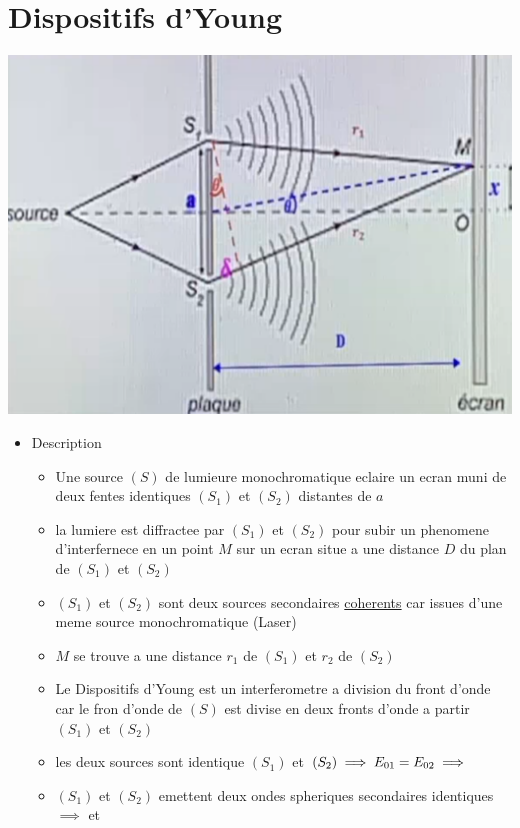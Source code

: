 \documentclass[12pt]{book}
\begin{document}
        \section{Dispositifs d'Young}
            \begin{center}
                \includegraphics[width=0.3\linewidth]{pic/young.png}
            \end{center}
            \begin{itemize}
               \item Description \\
                    \begin{itemize}
                        \item Une source $(S)$ de lumieure monochromatique eclaire un ecran muni de deux fentes identiques $(S_1)$ et $(S_2)$ distantes de $a$
                        \item la lumiere est diffractee par $(S_1)$ et $(S_2)$ pour subir un phenomene d'interfernece en un point $M$ sur un ecran situe a une distance $D$ du plan de $(S_1)$ et $(S_2)$ 
                        \item $(S_1)$ et $(S_2)$ sont deux sources secondaires \underline{coherents} car issues d'une meme source monochromatique (Laser)
                        \item $M$ se trouve a une distance $r_1$ de $(S_1)$ et $r_2$ de $(S_2)$
                        \item Le Dispositifs d'Young est un interferometre a division du front d'onde car le fron d'onde de $(S)$ est divise en deux fronts d'onde a partir $(S_1)$ et $(S_2)$
                        \item les deux sources sont identique $(S_1)$ et $(S_2) \\
                         \implies  E_{01}=E_{02} \implies$
                        \item $(S_1)$ et $(S_2)$ emettent deux ondes spheriques secondaires identiques \\ $\implies $  et  

\end{itemize}
\end{itemize}
\end{document}
